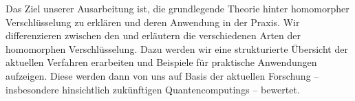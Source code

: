 \label{sec:ziel}
    Das Ziel unserer Ausarbeitung ist, die grundlegende Theorie hinter homomorpher Verschlüsselung zu erklären und deren Anwendung in der Praxis. Wir differenzieren zwischen den und erläutern die verschiedenen Arten der homomorphen Verschlüsselung. Dazu werden wir eine strukturierte Übersicht der aktuellen Verfahren erarbeiten und Beispiele für praktische Anwendungen aufzeigen. Diese werden dann von uns auf Basis der aktuellen Forschung – insbesondere hinsichtlich zukünftigen Quantencomputings – bewertet.
